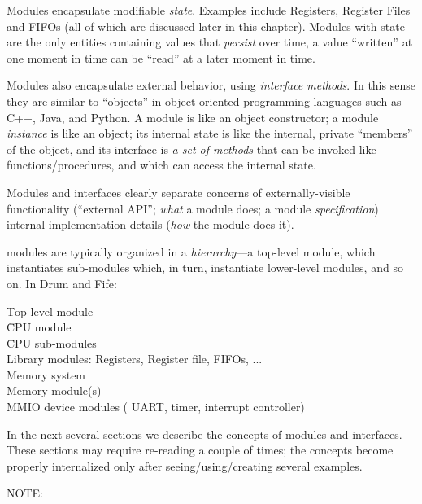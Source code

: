 Modules encapsulate modifiable \emph{state}.  Examples include
Registers, Register Files and FIFOs (all of which are discussed later
in this chapter).  Modules with state are the only entities containing
values that \emph{persist} over time, {\ie} a value ``written'' at one
moment in time can be ``read'' at a later moment in time.


Modules also encapsulate external behavior, using \emph{interface
methods}.  In this sense they are similar to ``objects'' in
object-oriented programming languages such as C++, Java, and Python.
A {\BSV} module is like an object constructor; a module \emph{instance}
is like an object; its internal state is like the internal, private
``members'' of the object, and its interface is \emph{a set of
methods} that can be invoked like functions/procedures, and which can
access the internal state.

Modules and interfaces clearly separate concerns of externally-visible
functionality (``external API''; \emph{what} a module does; a module
\emph{specification}) {\vs} internal implementation details
(\emph{how} the module does it).

{\BSV} modules are typically organized in a \emph{hierarchy}---a
top-level module, which instantiates sub-modules which, in turn,
instantiate lower-level modules, and so on. In Drum and Fife:
\begin{tabbing}
\hmm \= Top-level module \\
     \> \hmm \= CPU module \\
     \>      \> \hmm \= CPU sub-modules \\
     \>      \>      \> \hmm Library modules: Registers, Register file, FIFOs, ... \\
     \>      \> Memory system \\
     \>      \>      \> Memory module(s) \\
     \>      \>      \> MMIO device modules ({\eg} UART, timer, interrupt controller)
\end{tabbing}

In the next several sections we describe the concepts of {\BSV} modules
and interfaces.  These sections may require re-reading a couple of
times; the concepts become properly internalized only after
seeing/using/creating several examples.

\vspace{2ex}

NOTE: 

